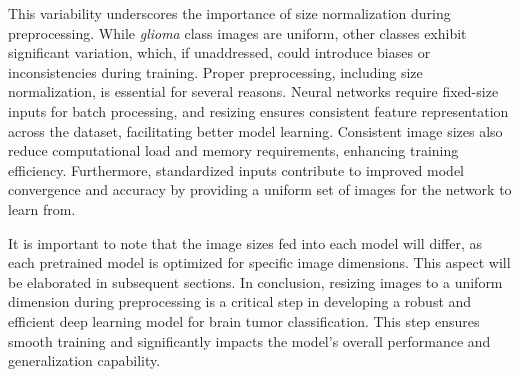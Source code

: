 This variability underscores the importance of size normalization during preprocessing. While \textit{glioma} class images are uniform, other classes exhibit significant variation, which, if unaddressed, could introduce biases or inconsistencies during training. Proper preprocessing, including size normalization, is essential for several reasons. Neural networks require fixed-size inputs for batch processing, and resizing ensures consistent feature representation across the dataset, facilitating better model learning. Consistent image sizes also reduce computational load and memory requirements, enhancing training efficiency. Furthermore, standardized inputs contribute to improved model convergence and accuracy by providing a uniform set of images for the network to learn from.

It is important to note that the image sizes fed into each model will differ, as each pretrained model is optimized for specific image dimensions. This aspect will be elaborated in subsequent sections. In conclusion, resizing images to a uniform dimension during preprocessing is a critical step in developing a robust and efficient deep learning model for brain tumor classification. This step ensures smooth training and significantly impacts the model's overall performance and generalization capability.

